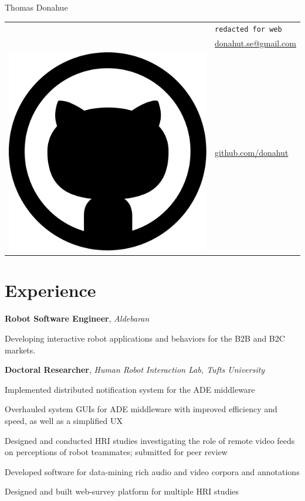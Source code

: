 \documentclass[10pt, letter]{article}
\newcommand*\github{\includegraphics[height=2ex]{github.pdf}}
\newcommand{\years}[1]{\marginnote{\footnotesize #1}}
\newenvironment{itemize*}{
  \begin{itemize}
    \setlength{\itemsep}{0pt}
    \setlength{\parskip}{-1pt}
    \setlength{\parsep}{-1pt}
  }{
  \end{itemize}
}
\begin{document}
\begin{minipage}[t]{0.55\textwidth}
  {\huge Thomas Donahue}
\end{minipage}
\begin{minipage}[t]{0.4\textwidth}
  \begin{tabular}[h]{ll}
    \Phone{}    & \texttt{redacted for web}\\
    \Envelope{} & \href{mailto:donahut.se@gmail.com}{donahut.se@gmail.com}\\    
    \github{}   & \href{http://www.github.com/donahut}{github.com/donahut}
  \end{tabular}
\end{minipage}

\section*{Experience}
\years{Mar 2014--}
\textbf{Robot Software Engineer}, \textsl{Aldebaran}
\begin{itemize*}
\item Developing interactive robot applications and behaviors for the
  B2B and B2C markets.
\end{itemize*}

\years{2012--2014}
\textbf{Doctoral Researcher}, \textsl{Human Robot Interaction Lab,
  Tufts University}
\begin{itemize*}
\item Implemented distributed notification system for the ADE middleware
\item Overhauled system GUIs for ADE middleware with improved
  efficiency and\\ speed, as well as a simplified UX 
\item Designed and conducted HRI studies investigating the role of
  remote video feeds\\ on perceptions of robot teammates; submitted
  for peer review 
\item Developed software for data-mining rich audio and video corpora
  and annotations
\item Designed and built web-survey platform for multiple HRI studies
\end{itemize*}
\end{document}
